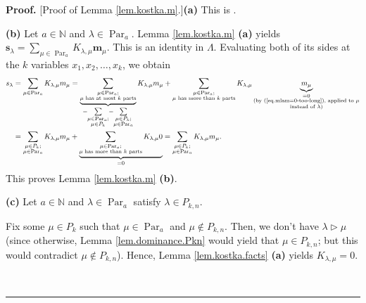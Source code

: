 \documentclass[numbers=enddot,12pt,final,onecolumn,notitlepage]{scrartcl}%
\theoremstyle{definition}
\newenvironment{proof}[1][Proof]{\noindent\textbf{#1.} }{\ \rule{0.5em}{0.5em}}
\let\sumnonlimits\sum
\renewcommand{\sum}{\sumnonlimits\limits}
\begin{document}
\begin{proof}
[Proof of Lemma \ref{lem.kostka.m}.]\textbf{(a)} This is \cite[Exercise
2.2.13(c)]{GriRei18}.

\textbf{(b)} Let $a\in\mathbb{N}$ and $\lambda\in\operatorname*{Par}%
\nolimits_{a}$. Lemma \ref{lem.kostka.m} \textbf{(a)} yields $\mathbf{s}%
_{\lambda}=\sum_{\mu\in\operatorname*{Par}\nolimits_{a}}K_{\lambda,\mu
}\mathbf{m}_{\mu}$. This is an identity in $\Lambda$. Evaluating both of its
sides at the $k$ variables $x_{1},x_{2},\ldots,x_{k}$, we obtain%
\begin{align*}
s_{\lambda}  &  =\sum_{\mu\in\operatorname*{Par}\nolimits_{a}}K_{\lambda,\mu
}m_{\mu}=\underbrace{\sum_{\substack{\mu\in\operatorname*{Par}\nolimits_{a}%
;\\\mu\text{ has at most }k\text{ parts}}}}_{=\sum_{\substack{\mu
\in\operatorname*{Par}\nolimits_{a};\\\mu\in P_{k}}}=\sum_{\substack{\mu\in
P_{k};\\\mu\in\operatorname*{Par}\nolimits_{a}}}}K_{\lambda,\mu}m_{\mu}%
+\sum_{\substack{\mu\in\operatorname*{Par}\nolimits_{a};\\\mu\text{ has more
than }k\text{ parts}}}K_{\lambda,\mu}\underbrace{m_{\mu}}%
_{\substack{=0\\\text{(by (\ref{eq.mlam=0-too-long}), applied to }%
\mu\\\text{instead of }\lambda\text{)}}}\\
&  =\sum_{\substack{\mu\in P_{k};\\\mu\in\operatorname*{Par}\nolimits_{a}%
}}K_{\lambda,\mu}m_{\mu}+\underbrace{\sum_{\substack{\mu\in\operatorname*{Par}%
\nolimits_{a};\\\mu\text{ has more than }k\text{ parts}}}K_{\lambda,\mu}%
0}_{=0}=\sum_{\substack{\mu\in P_{k};\\\mu\in\operatorname*{Par}\nolimits_{a}%
}}K_{\lambda,\mu}m_{\mu}.
\end{align*}
This proves Lemma \ref{lem.kostka.m} \textbf{(b)}.

\textbf{(c)} Let $a\in\mathbb{N}$ and $\lambda\in\operatorname*{Par}%
\nolimits_{a}$ satisfy $\lambda\in P_{k,n}$.

Fix some $\mu\in P_{k}$ such that $\mu\in\operatorname*{Par}\nolimits_{a}$ and
$\mu\notin P_{k,n}$. Then, we don't have $\lambda\triangleright\mu$ (since
otherwise, Lemma \ref{lem.dominance.Pkn} would yield that $\mu\in P_{k,n}$;
but this would contradict $\mu\notin P_{k,n}$). Hence, Lemma
\ref{lem.kostka.facts} \textbf{(a)} yields $K_{\lambda,\mu}=0$.


\end{proof}
\end{document}
